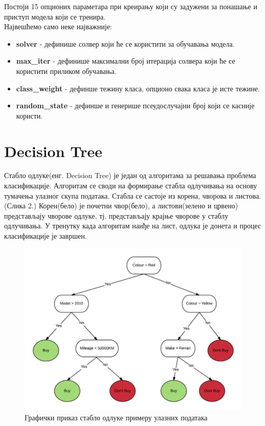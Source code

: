\documentclass[11pt]{article} %
\begin{document}
Постоји 15 опционих параметара при креирању који су задужени за понашање и приступ модела који се тренира. \\
Највешћемо само неке најважније:

\begin{itemize}
	\item \textbf{solver} - дефинише солвер који ће се користити за обучавања модела.
	\item \textbf{max\_iter} - дефинише максимални број итерација солвера који ће се користити приликом обучавања.
	\item \textbf{class\_weight} - дефинше тежину класа, опционо свака класа је исте тежине.
	\item \textbf{random\_state} - дефинше и генерише псеудослучајни број који се касније користи.
\end{itemize}
\section{Decision Tree}
Стабло одлуке(енг. Decision Tree) је један од алгоритама за решавања проблема класификације. Алгоритам се своди на формирање стабла одлучивања на основу тумачења улазног скупа података. Стабла се састоје из корена, чворова и листова. (Слика 2.) Корен(бело) је почетни чвор(бело), а листови(зелено и црвено) представљају чворове одлуке, тј. представљају крајње чворове у стаблу одлучивања. У тренутку када алгоритам наиђе на лист, одлука је донета и процес класификације је завршен.
\\
\begin{figure}[h]
\centering
	\includegraphics[scale=0.3]{decision_tree}
	\caption{Графички приказ стабло одлуке примеру улазних података}
\end{figure}
\end{document}
